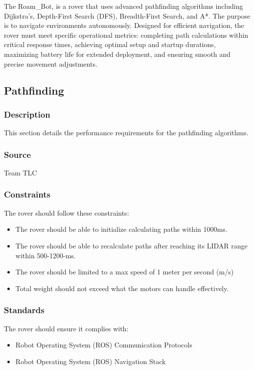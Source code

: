 
The Roam\_Bot, is a rover that uses advanced pathfinding algorithms including Dijkstra's, Depth-First Search (DFS), Breadth-First Search, and A*. The purpose is to navigate environments autonomously. Designed for efficient navigation, the rover must meet specific operational metrics: completing path calculations within critical response times, achieving optimal setup and startup durations, maximizing battery life for extended deployment, and ensuring smooth and precise movement adjustments.

\subsection{Pathfinding}
\subsubsection{Description}
This section details the performance requirements for the pathfinding algorithms.
\subsubsection{Source}
Team TLC
\subsubsection{Constraints}
The rover should follow these constraints:
\begin{itemize}
  \item The rover should be able to initialize calculating paths within 1000ms. 
  \item The rover should be able to recalculate paths after reaching its LIDAR range within 500-1200-ms.
  \item The rover should be limited to a max speed of 1 meter per second (m/s)
  \item Total weight should not exceed what the motors can handle effectively.
\end{itemize}
\subsubsection{Standards}
The rover should ensure it complies with:
\begin{itemize}
  \item Robot Operating System (ROS) Communication Protocols \cite{ROSCOM}
  \item Robot Operating System (ROS) Navigation Stack \cite{ROSCOM}
\end{itemize}

